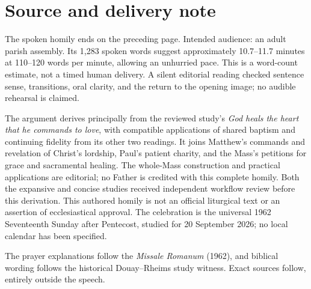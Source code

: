 \clearpage
\begingroup\small
\setlength{\parskip}{0.3em}
\section*{Source and delivery note}

The spoken homily ends on the preceding page. Intended audience: an adult parish assembly. Its 1,283 spoken words suggest approximately 10.7--11.7 minutes at 110--120 words per minute, allowing an unhurried pace. This is a word-count estimate, not a timed human delivery. A silent editorial reading checked sentence sense, transitions, oral clarity, and the return to the opening image; no audible rehearsal is claimed.

The argument derives principally from the reviewed study's \emph{God heals the heart that he commands to love}, with compatible applications of shared baptism and continuing fidelity from its other two readings. It joins Matthew's commands and revelation of Christ's lordship, Paul's patient charity, and the Mass's petitions for grace and sacramental healing. The whole-Mass construction and practical applications are editorial; no Father is credited with this complete homily. Both the expansive and concise studies received independent workflow review before this derivation. This authored homily is not an official liturgical text or an assertion of ecclesiastical approval. The celebration is the universal 1962 Seventeenth Sunday after Pentecost, studied for 20 September 2026; no local calendar has been specified.

The prayer explanations follow the \emph{Missale Romanum} (1962), and biblical wording follows the historical Douay--Rheims study witness. Exact sources follow, entirely outside the speech.

